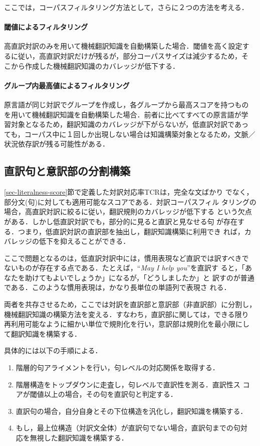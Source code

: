 ここでは，コーパスフィルタリング方法として，さらに２つの方法を考える．

\paragraph{閾値によるフィルタリング}

高直訳対訳のみを用いて機械翻訳知識を自動構築した場合．閾値を高く設定す
るに従い，高直訳対訳だけが残るが，部分コーパスサイズは減少するため，そ
こから作成した機械翻訳知識のカバレッジが低下する．

\paragraph{グループ内最高値によるフィルタリング}

原言語が同じ対訳でグループを作成し，各グループから最高スコアを持つもの
を用いて機械翻訳知識を自動構築した場合．前者に比べてすべての原言語が学
習対象となるため，翻訳知識のカバレッジが下がらないが，低直訳対訳であっ
ても，コーパス中に１回しか出現しない場合は知識構築対象となるため，文脈／
状況依存訳が残る可能性がある．


\subsection{直訳句と意訳部の分割構築}

\ref{sec-literalness-score}節で定義した対訳対応率TCRは，完全な文ばかり
でなく，部分文(句)に対しても適用可能なスコアである．対訳コーパスフィル
タリングの場合，高直訳対訳に絞るに従い，翻訳規則のカバレッジが低下する
という欠点がある．しかし低直訳対訳でも，部分的に見ると直訳と見なせる句
が存在する．つまり，低直訳対訳の直訳部を抽出し，翻訳知識構築に利用でき
れば，カバレッジの低下を抑えることができる．

ここで問題となるのは，低直訳対訳中には，慣用表現など直訳では訳すべきで
ないものが存在する点である．たとえば，``{\it May I help you}''を直訳す
ると，「あなたを助けてもよいでしょうか」になるが，「どうしましたか」と
訳すのが普通である．このような慣用表現は，かなり長単位の単語列で表現さ
れる．

両者を共存させるため，ここでは対訳を直訳部と意訳部（非直訳部）に分割し，
機械翻訳知識の構築方法を変える．すなわち，直訳部に関しては，できる限り
再利用可能なように細かい単位で規則化を行い，意訳部は規則化を最小限にし
て翻訳知識を構築する．

具体的には以下の手順による．

\begin{enumerate}
\item 階層的句アライメントを行い，句レベルの対応関係を取得する．
\item 階層構造をトップダウンに走査し，句レベルで直訳性を測る．直訳性ス
コアが閾値以上の場合，その句を直訳句と判定する．
\item 直訳句の場合，自分自身とその下位構造を汎化し，翻訳知識を構築する．
\item もし，最上位構造（対訳文全体）が直訳句でない場合，直訳句までの句対
応を無視した翻訳知識を構築する．
\end{enumerate}

